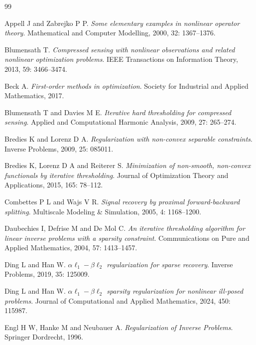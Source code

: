 \documentclass[a4paper,12pt]{article}
\numberwithin{equation}{section}
\begin{document}
\begin{thebibliography}{99}

Appell J and Zabrejko P P. \emph{Some elementary examples in nonlinear operator theory}. Mathematical and Computer Modelling, 2000, 32: 1367--1376.

Blumensath T. \emph{Compressed sensing with nonlinear observations and related nonlinear optimization problems}. IEEE Transactions on Information Theory, 2013, 59: 3466--3474.

Beck A. \emph{First-order methods in optimization}. Society for Industrial and Applied Mathematics, 2017.

Blumensath T and Davies M E. \emph{Iterative hard thresholding for compressed sensing}. Applied and Computational Harmonic Analysis, 2009, 27: 265--274.

Bredies K and Lorenz D A. \emph{Regularization with non-convex separable constraints}. Inverse Problems, 2009, 25: 085011.

Bredies K, Lorenz D A and Reiterer S. \emph{Minimization of non-smooth, non-convex functionals by iterative thresholding}. Journal of Optimization Theory and Applications, 2015, 165: 78--112.


Combettes P L and Wajs V R. \emph{Signal recovery by proximal forward-backward splitting}. Multiscale Modeling \& Simulation, 2005, 4: 1168--1200.

Daubechies I, Defrise M and De Mol C. \emph{An iterative thresholding algorithm for linear inverse problems with a sparsity constraint}. Communications on Pure and Applied Mathematics, 2004, 57: 1413--1457.

Ding L and Han W. \emph{$\alpha\ell_{1}-\beta\ell_{2}$ regularization for sparse recovery}. Inverse Problems, 2019, 35: 125009.

Ding L and Han W. \emph{$\alpha\ell_{1}-\beta\ell_{2}$ sparsity regularization for nonlinear ill-posed problems}. Journal of Computational and Applied Mathematics, 2024, 450: 115987.

Engl H W, Hanke M and Neubauer A. \emph{Regularization of Inverse Problems}. Springer Dordrecht, 1996.


\end{thebibliography}
\end{document}
